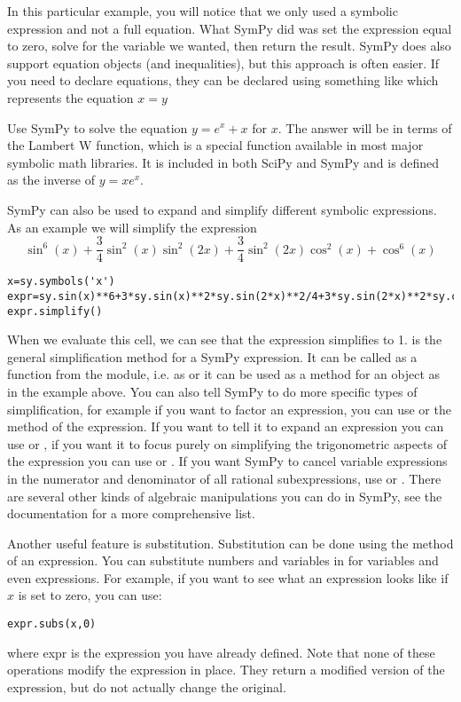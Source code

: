 In this particular example, you will notice that we only used a symbolic expression and not a full equation.
What SymPy did was set the expression equal to zero, solve for the variable we wanted, then return the result.
SymPy does also support equation objects (and inequalities), but this approach is often easier.
If you need to declare equations, they can be declared using something like  which represents the equation $x=y$

\begin{problem}
Use SymPy to solve the equation $y=e^x+x$ for $x$.
The answer will be in terms of the Lambert W function, which is a special function available in most major symbolic math libraries.
It is included in both SciPy and SymPy and is defined as the inverse of $y=x e^x$.
\end{problem}

SymPy can also be used to expand and simplify different symbolic expressions.
As an example we will simplify the expression
$$\sin^6(x)+\frac{3}{4}\sin^2(x)\sin^2(2x)+\frac{3}{4}\sin^2(2x)\cos^2(x)+\cos^6(x)$$
\begin{lstlisting}
x=sy.symbols('x')
expr=sy.sin(x)**6+3*sy.sin(x)**2*sy.sin(2*x)**2/4+3*sy.sin(2*x)**2*sy.cos(x)**2/4+sy.cos(x)**6
expr.simplify()
\end{lstlisting}
When we evaluate this cell, we can see that the expression simplifies to 1.
 is the general simplification method for a SymPy expression.
It can be called as a function from the module, i.e. as  or it can be used as a method for an object as in the example above.
You can also tell SymPy to do more specific types of simplification, for example if you want to factor an expression, you can use  or the  method of the expression.
If you want to tell it to expand an expression you can use  or , if you want it to focus purely on simplifying the trigonometric aspects of the expression you can use  or .
If you want SymPy to cancel variable expressions in the numerator and denominator of all rational subexpressions, use  or .
There are several other kinds of algebraic manipulations you can do in SymPy, see the documentation for a more comprehensive list.

Another useful feature is substitution.
Substitution can be done using the  method of an expression.
You can substitute numbers and variables in for variables and even expressions.
For example, if you want to see what an expression looks like if $x$ is set to zero, you can use:
\begin{lstlisting}
expr.subs(x,0)
\end{lstlisting}
where expr is the expression you have already defined.
Note that none of these operations modify the expression in place.
They return a modified version of the expression, but do not actually change the original.

